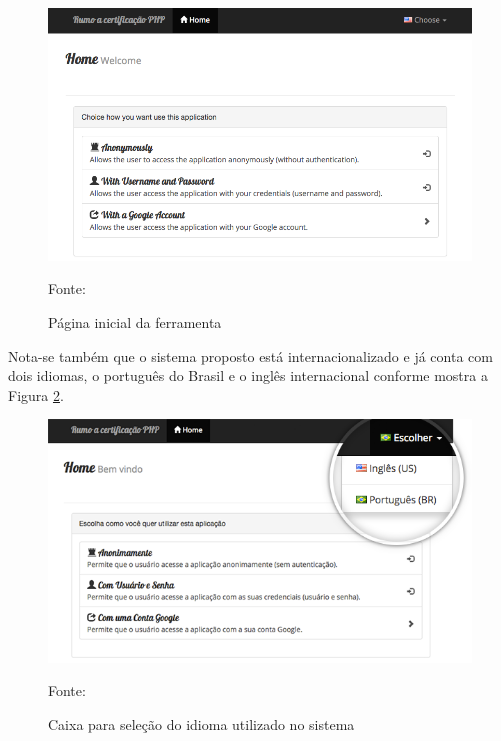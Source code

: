 \begin{figure}[h!tb]
	\caption{Página inicial da ferramenta}
	\label{fig:zcpeHome}

	\centering
	\includegraphics[width=\textwidth]{images/resultados/zcpe-home.png}

	\centering
	\footnotesize Fonte: \fonteOAutor
\end{figure}

\FloatBarrier 	%

Nota-se também que o sistema proposto está internacionalizado e já conta com
dois idiomas, o português do Brasil e o inglês internacional conforme mostra a
Figura \ref{fig:zcpeIdioma}.

\begin{figure}[h!tb]
	\caption{Caixa para seleção do idioma utilizado no sistema}
	\label{fig:zcpeIdioma}

	\centering
	\includegraphics[width=\textwidth]{images/resultados/zcpe-idioma.png}

	\centering
	\footnotesize Fonte: \fonteOAutor
\end{figure}

